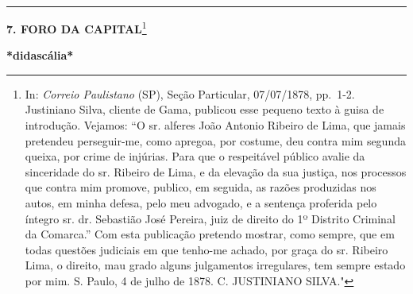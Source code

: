 \begin{center}\rule{0.5\linewidth}{\linethickness}\end{center}

\textbf{7. FORO DA CAPITAL}\footnote{In: \emph{Correio Paulistano} (SP),
  Seção Particular, 07/07/1878, pp.~1-2. Justiniano Silva, cliente de
  Gama, publicou esse pequeno texto à guisa de introdução. Vejamos: ``O
  sr. alferes João Antonio Ribeiro de Lima, que jamais pretendeu
  perseguir-me, como apregoa, por costume, deu contra mim segunda
  queixa, por crime de injúrias. Para que o respeitável público avalie
  da sinceridade do sr. Ribeiro de Lima, e da elevação da sua justiça,
  nos processos que contra mim promove, publico, em seguida, as razões
  produzidas nos autos, em minha defesa, pelo meu advogado, e a sentença
  proferida pelo íntegro sr. dr. Sebastião José Pereira, juiz de direito
  do 1º Distrito Criminal da Comarca.'' Com esta publicação pretendo
  mostrar, como sempre, que em todas questões judiciais em que tenho-me
  achado, por graça do sr. Ribeiro Lima, o direito, mau grado alguns
  julgamentos irregulares, tem sempre estado por mim. S. Paulo, 4 de
  julho de 1878. C. JUSTINIANO SILVA."}

\textbf{*didascália*}


